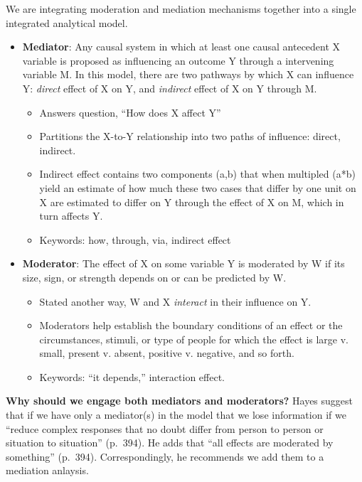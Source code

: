 \documentclass[
  11pt,
]{book}
\providecommand{\tightlist}{%
  \setlength{\itemsep}{0pt}\setlength{\parskip}{0pt}}
\begin{document}
We are integrating moderation and mediation mechanisms together into a single integrated analytical model.

\begin{itemize}
\tightlist
\item
  \textbf{Mediator}: Any causal system in which at least one causal antecedent X variable is proposed as influencing an outcome Y through a intervening variable M. In this model, there are two pathways by which X can influence Y: \emph{direct} effect of X on Y, and \emph{indirect} effect of X on Y through M.

  \begin{itemize}
  \tightlist
  \item
    Answers question, ``How does X affect Y''
  \item
    Partitions the X-to-Y relationship into two paths of influence: direct, indirect.
  \item
    Indirect effect contains two components (a,b) that when multipled (a*b) yield an estimate of how much these two cases that differ by one unit on X are estimated to differ on Y through the effect of X on M, which in turn affects Y.
  \item
    Keywords: how, through, via, indirect effect
  \end{itemize}
\item
  \textbf{Moderator}: The effect of X on some variable Y is moderated by W if its size, sign, or strength depends on or can be predicted by W.

  \begin{itemize}
  \tightlist
  \item
    Stated another way, W and X \emph{interact} in their influence on Y.\\
  \item
    Moderators help establish the boundary conditions of an effect or the circumstances, stimuli, or type of people for which the effect is large v. small, present v. absent, positive v. negative, and so forth.
  \item
    Keywords: ``it depends,'' interaction effect.
  \end{itemize}
\end{itemize}

\textbf{Why should we engage both mediators and moderators?} Hayes \citeyearpar{hayes_introduction_2018} suggest that if we have only a mediator(s) in the model that we lose information if we ``reduce complex responses that no doubt differ from person to person or situation to situation'' (p.~394). He adds that ``all effects are moderated by something'' (p.~394). Correspondingly, he recommends we add them to a mediation anlaysis.
\end{document}
